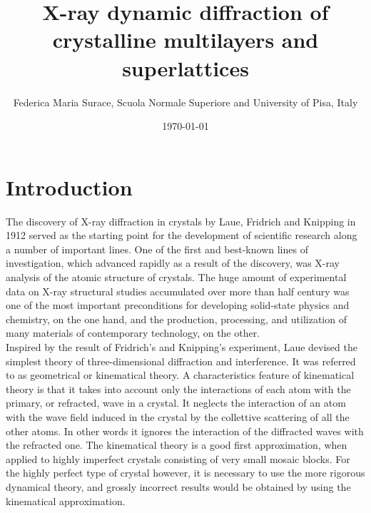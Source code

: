 \documentclass[12pt,oneside,notitlepage,abstracton,a4paper]{scrartcl}
\title{\Large X-ray dynamic diffraction of crystalline multilayers and superlattices}
\author{\normalsize Federica Maria Surace, Scuola Normale Superiore and University of Pisa, Italy}
\date{\normalsize \today}
\begin{document}
\maketitle

\begin{abstract}

\noindent

\end{abstract}



\newpage


\tableofcontents
\newpage 

\section{Introduction}
\label{intro}
The discovery of X-ray diffraction in crystals by Laue, Fridrich and Knipping in 1912 served as the starting point for the development of scientific research along a number of important lines. One of the first and best-known lines of investigation, which advanced rapidly as a result of the discovery, was X-ray analysis of the atomic structure of crystals. The huge amount of experimental data on X-ray structural studies accumulated over more than half century was one of the most important preconditions for developing solid-state physics and chemistry, on the one hand, and the production, processing, and utilization of many materials of contemporary technology, on the other.
\\

Inspired by the result of Fridrich's and Knipping's experiment, Laue devised the simplest theory of three-dimensional diffraction and interference. It was referred to as geometrical or kinematical theory. A characteristics feature of kinematical theory is that it takes into account only the interactions of each atom with the primary, or refracted, wave in a crystal. It neglects the interaction of an atom with the wave field induced in the crystal by the collettive scattering of all the other atoms. In other words it ignores the interaction of the diffracted waves with the refracted one. The kinematical theory is a good first approximation, when applied to highly imperfect crystals consisting of very small mosaic blocks. For the highly perfect type of crystal however, it is necessary to use the more rigorous dynamical theory, and grossly incorrect results would be obtained by using the kinematical approximation.
\end{document}
